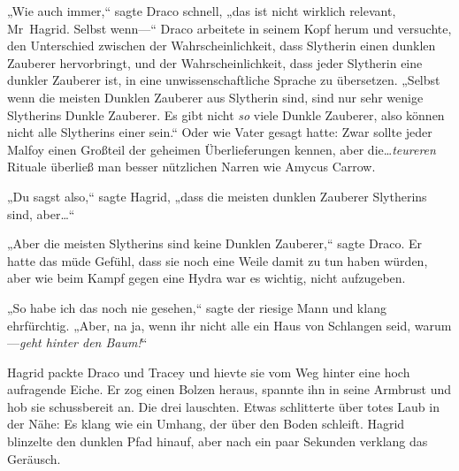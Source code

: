 „Wie auch immer,“ sagte Draco schnell, „das ist nicht wirklich relevant, Mr~Hagrid. Selbst wenn—“ Draco arbeitete in seinem Kopf herum und versuchte, den Unterschied zwischen der Wahrscheinlichkeit, dass Slytherin einen dunklen Zauberer hervorbringt, und der Wahrscheinlichkeit, dass jeder Slytherin eine dunkler Zauberer ist, in eine unwissenschaftliche Sprache zu übersetzen.
„Selbst wenn die meisten Dunklen Zauberer aus Slytherin sind, sind nur sehr wenige Slytherins Dunkle Zauberer. Es gibt nicht \emph{so} viele Dunkle Zauberer, also können nicht alle Slytherins einer sein.“
Oder wie Vater gesagt hatte: Zwar sollte jeder Malfoy einen Großteil der geheimen Überlieferungen kennen, aber die…\emph{teureren} Rituale überließ man besser nützlichen Narren wie Amycus Carrow.

„Du sagst also,“ sagte Hagrid, „dass die meisten dunklen Zauberer Slytherins sind, aber…“

„Aber die meisten Slytherins sind keine Dunklen Zauberer,“ sagte Draco.
Er hatte das müde Gefühl, dass sie noch eine Weile damit zu tun haben würden, aber wie beim Kampf gegen eine Hydra war es wichtig, nicht aufzugeben.

„So habe ich das noch nie gesehen,“ sagte der riesige Mann und klang ehrfürchtig. „Aber, na ja, wenn ihr nicht alle ein Haus von Schlangen seid, warum—\emph{geht hinter den Baum!}“

Hagrid packte Draco und Tracey und hievte sie vom Weg hinter eine hoch aufragende Eiche. Er zog einen Bolzen heraus, spannte ihn in seine Armbrust und hob sie schussbereit an.
Die drei lauschten. Etwas schlitterte über totes Laub in der Nähe: Es klang wie ein Umhang, der über den Boden schleift. Hagrid blinzelte den dunklen Pfad hinauf, aber nach ein paar Sekunden verklang das Geräusch.

